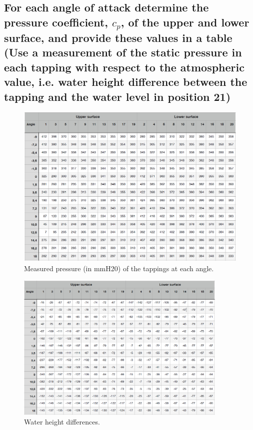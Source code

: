 \documentclass[11pt]{article}
\numberwithin{equation}{section}
\begin{document}
\subsection*{For each angle of attack determine the pressure coefficient, $c_p$, of the upper and lower surface, and provide these values in a table (Use a measurement of the static pressure in each tapping with respect to the atmospheric value, i.e. water height difference between the tapping and the water level in position 21)}
\begin{figure}[H]
  \centering
  \includegraphics[width=\textwidth]{./img/diagram6.png}
  \caption{Measured pressure (in mmH20) of the tappings at each angle.}
\end{figure}
\begin{figure}[H]
  \centering
  \includegraphics[width=0.9\textwidth]{./img/diagram7.png}
  \caption{Water height differences.}
\end{figure}
\end{document}
